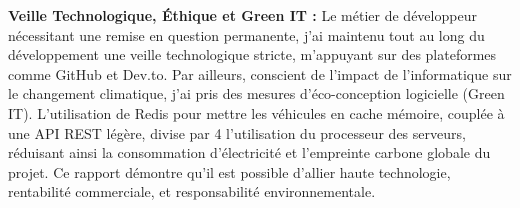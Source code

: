 \textbf{Veille Technologique, Éthique et Green IT :}
Le métier de développeur nécessitant une remise en question permanente, j'ai maintenu tout au long du développement une veille technologique stricte, m'appuyant sur des plateformes comme GitHub et Dev.to. Par ailleurs, conscient de l'impact de l'informatique sur le changement climatique, j'ai pris des mesures d'éco-conception logicielle (Green IT). L'utilisation de Redis pour mettre les véhicules en cache mémoire, couplée à une API REST légère, divise par 4 l'utilisation du processeur des serveurs, réduisant ainsi la consommation d'électricité et l'empreinte carbone globale du projet. Ce rapport démontre qu'il est possible d'allier haute technologie, rentabilité commerciale, et responsabilité environnementale.
